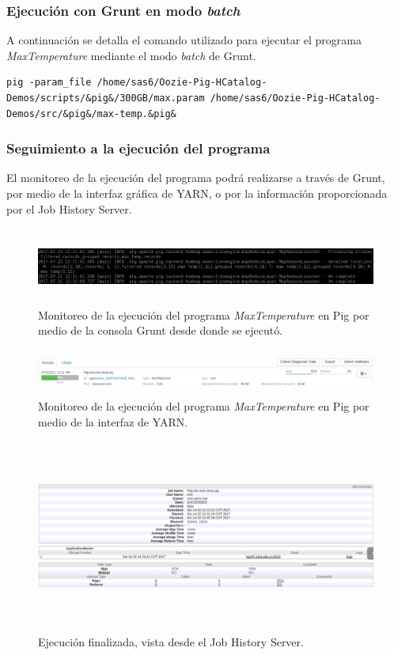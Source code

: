 \subsubsection{Ejecución con Grunt en modo \textit{batch}}

A continuación se detalla el comando utilizado para ejecutar el programa \textit{MaxTemperature} mediante el modo \textit{batch} de Grunt.

\begin{lstlisting}[linewidth=\columnwidth,breaklines=true]
pig -param_file /home/sas6/Oozie-Pig-HCatalog-Demos/scripts/&pig&/300GB/max.param /home/sas6/Oozie-Pig-HCatalog-Demos/src/&pig&/max-temp.&pig&
\end{lstlisting}

\subsubsection{Seguimiento a la ejecución del programa}

El monitoreo de la ejecución del programa podrá realizarse a través de Grunt, por medio de la interfaz gráfica de YARN, o por la información proporcionada por el Job History Server.

\begin{figure}[H]
  \centering
      \includegraphics[width=\textwidth, height=1.0in]{fig/04/03}
  \caption{Monitoreo de la ejecución del programa \textit{MaxTemperature} en Pig por medio de la consola Grunt desde donde se ejecutó.}
\end{figure}

\begin{figure}[H]
  \centering
      \includegraphics[width=\textwidth, height=0.6in]{fig/04/04}
  \caption{Monitoreo de la ejecución del programa \textit{MaxTemperature} en Pig por medio de la interfaz de YARN.}
\end{figure}

\begin{figure}[H]
  \centering
      \includegraphics[width=\textwidth, height=2.5in]{fig/04/05}
  \caption{Ejecución finalizada, vista desde el Job History Server.}
\end{figure}

